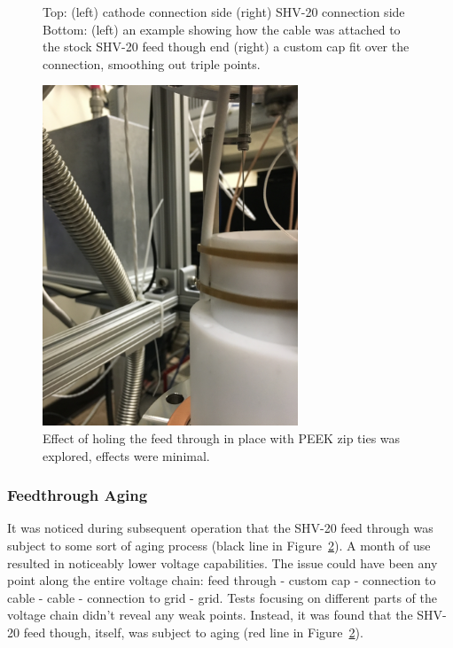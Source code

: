 \begin{figure}[htbp]
\begin{minipage}{0.47\textwidth}
    \end{minipage}
\caption{Top: (left) cathode connection side (right) SHV-20 connection side Bottom: (left) an example showing how the cable was attached to the stock SHV-20 feed though end (right) a custom cap fit over the connection, smoothing out triple points.}
 \label{fig:shv20}
\end{figure}

 \begin{figure}[htbp]
\begin{center}
\includegraphics[width=3in, angle=-90]{figures/testbed/ft3_5.jpg}
\caption{Effect of holing the feed through in place with PEEK zip ties was explored, effects were minimal.}
\label{fig:aging}
\end{center}
\end{figure}


 
\subsubsection{Feedthrough Aging}
It was noticed during subsequent operation that the SHV-20 feed through was subject to some sort of aging process (black line in Figure~\ref{fig:aging}). A month of use resulted in noticeably lower voltage capabilities. The issue could have been any point along the entire voltage chain: feed through - custom cap - connection to cable - cable - connection to grid - grid. Tests focusing on different parts of the voltage chain didn't reveal any weak points. Instead, it was found that the SHV-20 feed though, itself, was subject to aging (red line in Figure~\ref{fig:aging}). 


